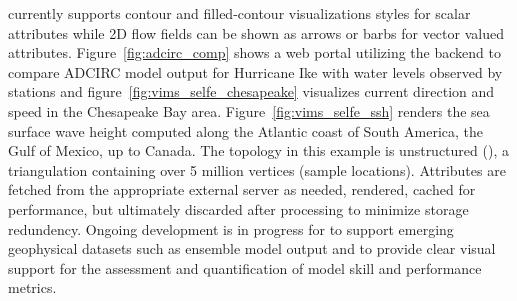 \sciwms{} currently supports contour and filled-contour visualizations
styles for scalar attributes while 2D flow fields can be shown as
arrows or barbs for vector valued
attributes. Figure~\ref{fig:adcirc_comp} shows a web portal utilizing
the \sciwms{} backend to compare ADCIRC model output for Hurricane Ike
with water levels observed by \noaa{} stations and
figure~\ref{fig:vims_selfe_chesapeake} visualizes current direction
and speed in the Chesapeake Bay area. Figure~\ref{fig:vims_selfe_ssh}
renders the sea surface wave height computed along the Atlantic coast
of South America, the Gulf of Mexico, up to Canada. The topology in
this example is unstructured (\ugrid{}), a triangulation containing
over 5 million vertices (sample locations). Attributes are fetched
from the appropriate external server as needed, rendered, cached for
performance, but ultimately discarded after processing to minimize
storage redundency. Ongoing development is in progress for \sciwms{}
to support emerging geophysical datasets such as ensemble model output
and to provide clear visual support for the assessment and
quantification of model skill and performance metrics.
